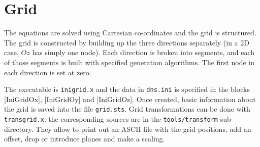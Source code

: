 \chapter{Grid}\label{sec:grid}

The equations are solved using Cartesian co-ordinates and the grid is structured. The grid is constructed by building up the three directions separately (in a 2D case, $Oz$ has simply one node).  Each direction is broken into segments, and each of those segments is built with specified generation algorithms. The first node in each direction is set at zero.

The executable is {\tt inigrid.x} and the data in {\tt dns.ini} is specified in the blocks [IniGridOx], [IniGridOy] and [IniGridOz]. Once created, basic information about the grid is saved into the file {\tt grid.sts}. Grid transformations can be done with {\tt transgrid.x}; the corresponding sources are in the {\tt tools/transform} sub-directory. They allow to print out an ASCII file with the grid positions, add an offset, drop or introduce planes and make a scaling.%

